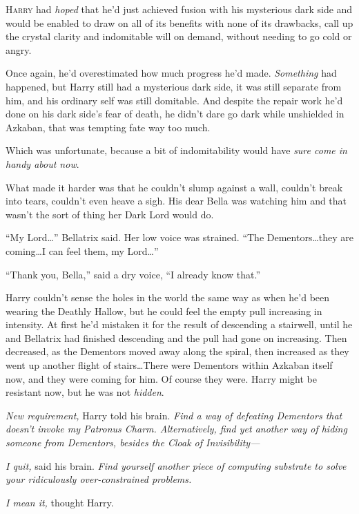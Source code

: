 
\lettrine{H}{arry} had \emph{hoped} that he’d just achieved fusion with his mysterious dark side and would be enabled to draw on all of its benefits with none of its drawbacks, call up the crystal clarity and indomitable will on demand, without needing to go cold or angry.

Once again, he’d overestimated how much progress he’d made. \emph{Something} had happened, but Harry still had a mysterious dark side, it was still separate from him, and his ordinary self was still domitable. And despite the repair work he’d done on his dark side’s fear of death, he didn’t dare go dark while unshielded in Azkaban, that was tempting fate way too much.

Which was unfortunate, because a bit of indomitability would have \emph{sure come in handy about now}.

What made it harder was that he couldn’t slump against a wall, couldn’t break into tears, couldn’t even heave a sigh. His dear Bella was watching him and that wasn’t the sort of thing her Dark Lord would do.

“My Lord…” Bellatrix said. Her low voice was strained.
“The Dementors…they are coming…I can feel them, my Lord…”

“Thank you, Bella,” said a dry voice,
“I already know that.”

Harry couldn’t sense the holes in the world the same way as when he’d been wearing the Deathly Hallow, but he could feel the empty pull increasing in intensity. At first he’d mistaken it for the result of descending a stairwell, until he and Bellatrix had finished descending and the pull had gone on increasing. Then decreased, as the Dementors moved away along the spiral, then increased as they went up another flight of stairs…There were Dementors within Azkaban itself now, and they were coming for him. Of course they were. Harry might be resistant now, but he was not \emph{hidden}.

\emph{New requirement,} Harry told his brain. \emph{Find a way of defeating Dementors that doesn’t invoke my Patronus Charm. Alternatively, find yet another way of hiding someone from Dementors, besides the Cloak of Invisibility—}

\emph{I quit,} said his brain. \emph{Find yourself another piece of computing substrate to solve your ridiculously over-constrained problems.}

\emph{I mean it,} thought Harry.

